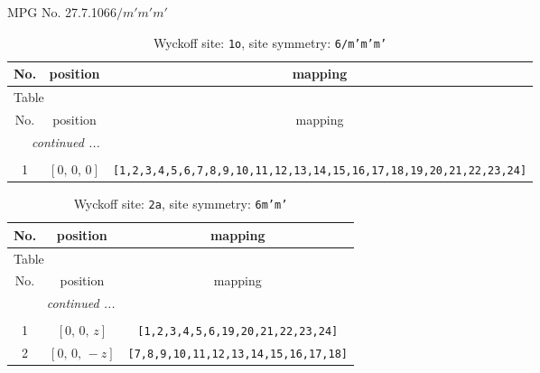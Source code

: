 \documentclass[fleqn,8pt]{jsarticle}
\begin{document}
\setcounter{MaxMatrixCols}{32}

\renewcommand{\tablename}{Table~}
\renewcommand{\figurename}{Figure~}
\begin{center}
\LARGE
MPG No. 27.7.106\quad$6/m'm'm'$
\end{center}
\renewcommand{\arraystretch}{1.2}
\begin{longtable}{ccc}
\caption{Wyckoff site: {\tt 1o}, site symmetry: {\tt 6/m'm'm'}}
 \\
 \hline \hline
No. & position & mapping \\ \hline \endfirsthead

\multicolumn{2}{l}{\tablename\ \thetable{}} \\
 \hline \hline
No. & position & mapping \\ \hline \endhead

 \hline \hline
\multicolumn{2}{r}{\footnotesize\it continued ...} \\ \endfoot

 \hline \hline
\multicolumn{2}{r}{} \\ \endlastfoot

1 & $\left[ 0,\, 0,\, 0 \right]$ & {\tt [1,2,3,4,5,6,7,8,9,10,11,12,13,14,15,16,17,18,19,20,21,22,23,24]} \\
\end{longtable}
\renewcommand{\arraystretch}{1.2}
\begin{longtable}{ccc}
\caption{Wyckoff site: {\tt 2a}, site symmetry: {\tt 6m'm'}}
 \\
 \hline \hline
No. & position & mapping \\ \hline \endfirsthead

\multicolumn{2}{l}{\tablename\ \thetable{}} \\
 \hline \hline
No. & position & mapping \\ \hline \endhead

 \hline \hline
\multicolumn{2}{r}{\footnotesize\it continued ...} \\ \endfoot

 \hline \hline
\multicolumn{2}{r}{} \\ \endlastfoot

1 & $\left[ 0,\, 0,\, z \right]$ & {\tt [1,2,3,4,5,6,19,20,21,22,23,24]} \\ \hline
2 & $\left[ 0,\, 0,\, - z \right]$ & {\tt [7,8,9,10,11,12,13,14,15,16,17,18]} \\
\end{longtable}
\renewcommand{\arraystretch}{1.2}
\end{document}
